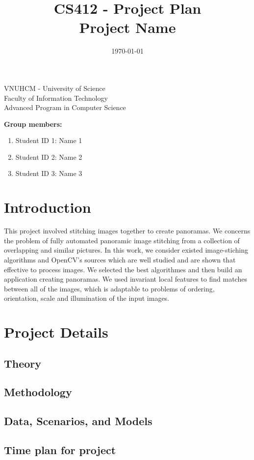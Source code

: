 \documentclass[a4paper, 12pt]{article}
\title{CS412 - Project Plan\\ Project Name}
\date{\today}
\begin{document}
\begin{center} 
\large VNUHCM - University of Science\\
Faculty of Information Technology\\
Advanced Program in Computer Science
\end{center}

\begingroup
\let\newpage\relax
\maketitle
\endgroup

\textbf{Group members:}
\begin{enumerate}
	\item Student ID 1: Name 1
	\item Student ID 2: Name 2
	\item Student ID 3: Name 3
\end{enumerate}

\section{Introduction}
This project involved stitching images together to create panoramas. We concerns the problem of fully automated panoramic image stitching from a collection of overlapping and similar pictures. In this work, we consider existed image-stiching algorithms and OpenCV's sources which are well studied and are shown that effective to process images. We selected the best algorithmes and then build an application creating panoramas. We used invariant local features to find matches between all of the images, which is adaptable to problems of ordering, orientation, scale and illumination of the input images.

\section{Project Details}

\subsection{Theory}

\subsection{Methodology}

\subsection{Data, Scenarios, and Models}

\subsection{Time plan for project}


\begin{thebibliography}{}

\end{thebibliography}
\end{document}
